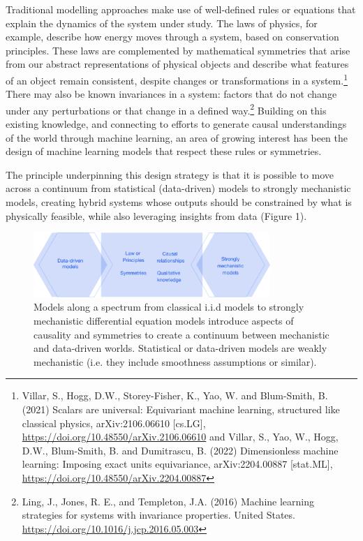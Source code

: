 Traditional modelling approaches make use of well-defined rules or
equations that explain the dynamics of the system under study. The laws
of physics, for example, describe how energy moves through a system,
based on conservation principles. These laws are complemented by
mathematical symmetries that arise from our abstract representations of
physical objects and describe what features of an object remain
consistent, despite changes or transformations in a system.\footnote{Villar,
  S., Hogg, D.W., Storey-Fisher, K., Yao, W. and Blum-Smith, B. (2021)
  Scalars are universal: Equivariant machine learning, structured like
  classical physics, arXiv:2106.06610 {[}cs.LG{]},
  \url{https://doi.org/10.48550/arXiv.2106.06610}
  and Villar, S., Yao, W., Hogg, D.W., Blum-Smith, B. and Dumitrascu, B.
  (2022) Dimensionless machine learning: Imposing exact units
  equivariance, arXiv:2204.00887 {[}stat.ML{]},
  \url{https://doi.org/10.48550/arXiv.2204.00887}}
There may also be known invariances in a system: factors that do not
change under any perturbations or that change in a defined
way.\footnote{Ling, J., Jones, R. E., and Templeton, J.A. (2016) Machine
  learning strategies for systems with invariance properties. United
  States.
  \url{https://doi.org/10.1016/j.jcp.2016.05.003}}
Building on this existing knowledge, and connecting to efforts to
generate causal understandings of the world through machine learning, an
area of growing interest has been the design of machine learning models
that respect these rules or symmetries.

The principle underpinning this design strategy is that it is possible
to move across a continuum from statistical (data-driven) models to
strongly mechanistic models, creating hybrid systems whose outputs
should be constrained by what is physically feasible, while also
leveraging insights from data (Figure 1).

\begin{figure}
\begin{center}
\includegraphics[width=0.8\textwidth]{media/figure-1.pdf}
\end{center}
\caption{Models along a spectrum from classical i.i.d models to strongly mechanistic differential equation models introduce aspects of causality and symmetries to create a continuum between mechanistic and data-driven worlds. Statistical or data-driven models are weakly mechanistic (i.e. they include smoothness assumptions or similar).}
\end{figure}

